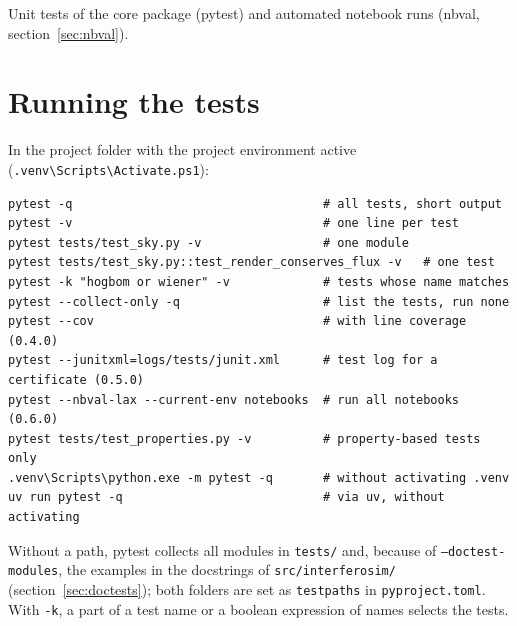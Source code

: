 \label{ch:tests}

Unit tests of the core package (pytest) and automated notebook runs
(nbval, section~\ref{sec:nbval}).

\section{Running the tests}

In the project folder with the project environment active
(\texttt{.venv\textbackslash Scripts\textbackslash Activate.ps1}):
\begin{lstlisting}[basicstyle=\ttfamily\footnotesize, frame=single]
pytest -q                                   # all tests, short output
pytest -v                                   # one line per test
pytest tests/test_sky.py -v                 # one module
pytest tests/test_sky.py::test_render_conserves_flux -v   # one test
pytest -k "hogbom or wiener" -v             # tests whose name matches
pytest --collect-only -q                    # list the tests, run none
pytest --cov                                # with line coverage (0.4.0)
pytest --junitxml=logs/tests/junit.xml      # test log for a certificate (0.5.0)
pytest --nbval-lax --current-env notebooks  # run all notebooks (0.6.0)
pytest tests/test_properties.py -v          # property-based tests only
.venv\Scripts\python.exe -m pytest -q       # without activating .venv
uv run pytest -q                            # via uv, without activating
\end{lstlisting}
Without a path, pytest collects all modules in \texttt{tests/} and,
because of \texttt{--doctest-modules}, the examples in the docstrings
of \texttt{src/interferosim/} (section~\ref{sec:doctests}); both
folders are set as \texttt{testpaths} in \texttt{pyproject.toml}. With
\texttt{-k}, a part of a test name or a boolean expression of names
selects the tests.

